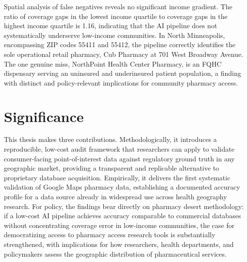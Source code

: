 \documentclass[12pt]{article}
\begin{document}
Spatial analysis of false negatives reveals no significant income gradient. The ratio of coverage gaps in the lowest income quartile to coverage gaps in the highest income quartile is 1.16, indicating that the AI pipeline does not systematically underserve low-income communities. In North Minneapolis, encompassing ZIP codes 55411 and 55412, the pipeline correctly identifies the sole operational retail pharmacy, Cub Pharmacy at 701 West Broadway Avenue. The one genuine miss, NorthPoint Health Center Pharmacy, is an FQHC dispensary serving an uninsured and underinsured patient population, a finding with distinct and policy-relevant implications for community pharmacy access.

\section{Significance}

This thesis makes three contributions. Methodologically, it introduces a reproducible, low-cost audit framework that researchers can apply to validate consumer-facing point-of-interest data against regulatory ground truth in any geographic market, providing a transparent and replicable alternative to proprietary database acquisition. Empirically, it delivers the first systematic validation of Google Maps pharmacy data, establishing a documented accuracy profile for a data source already in widespread use across health geography research. For policy, the findings bear directly on pharmacy desert methodology: if a low-cost AI pipeline achieves accuracy comparable to commercial databases without concentrating coverage error in low-income communities, the case for democratizing access to pharmacy access research tools is substantially strengthened, with implications for how researchers, health departments, and policymakers assess the geographic distribution of pharmaceutical services.


\end{document}
